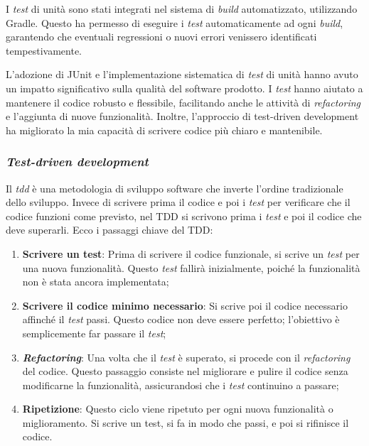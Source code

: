 I \textit{test} di unità sono stati integrati nel sistema di \textit{build} automatizzato, utilizzando Gradle. 
Questo ha permesso di eseguire i \textit{test} automaticamente ad ogni \textit{build}, 
garantendo che eventuali regressioni o nuovi errori venissero identificati tempestivamente.

L'adozione di JUnit e l'implementazione sistematica di \textit{test} di unità hanno avuto un impatto significativo sulla qualità del software prodotto. 
I \textit{test} hanno aiutato a mantenere il codice robusto e flessibile, facilitando anche le attività di \textit{refactoring} e l'aggiunta di nuove funzionalità. 
Inoltre, l'approccio di test-driven development ha migliorato la mia capacità di scrivere codice più chiaro e mantenibile.

\subsubsection{\textit{Test-driven development}}
Il \textit{\gls{tdd}} è una metodologia di sviluppo software che inverte l'ordine tradizionale dello sviluppo. 
Invece di scrivere prima il codice e poi i \textit{test} per verificare che il codice funzioni come previsto, nel TDD si scrivono prima 
i \textit{test} e poi il codice che deve superarli. Ecco i passaggi chiave del TDD:
\begin{enumerate}
  \item \textbf{Scrivere un test}: Prima di scrivere il codice funzionale, si scrive un \textit{test} per una nuova funzionalità. Questo \textit{test} fallirà inizialmente, poiché la funzionalità non è stata ancora implementata;
  \item \textbf{Scrivere il codice minimo necessario}: Si scrive poi il codice necessario affinché il \textit{test} passi. Questo codice non deve essere perfetto; l'obiettivo è semplicemente far passare il \textit{test};
  \item \textit{\textbf{Refactoring}}: Una volta che il \textit{test} è superato, si procede con il \textit{refactoring} del codice. Questo passaggio consiste nel migliorare e pulire il codice senza modificarne la funzionalità, assicurandosi che i \textit{test} continuino a passare;
  \item \textbf{Ripetizione}: Questo ciclo viene ripetuto per ogni nuova funzionalità o miglioramento. Si scrive un test, si fa in modo che passi, e poi si rifinisce il codice.
\end{enumerate}

